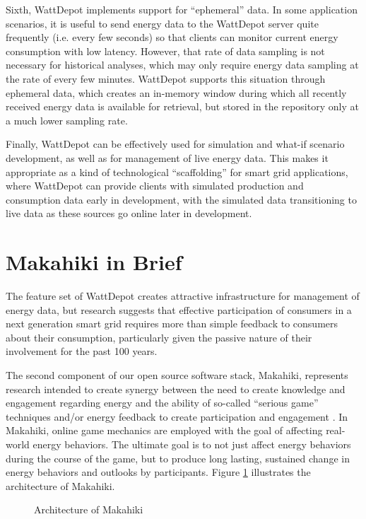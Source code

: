 \documentclass{acm_proc_article-sp}
\begin{document}
Sixth, WattDepot implements support for ``ephemeral'' data. In some application scenarios,
it is useful to send energy data to the WattDepot server quite frequently (i.e. every few
seconds) so that clients can monitor current energy consumption with low latency. However,
that rate of data sampling is not necessary for historical analyses, which may only
require energy data sampling at the rate of every few minutes. WattDepot supports this
situation through ephemeral data, which creates an in-memory window during which all
recently received energy data is available for retrieval, but stored in the repository
only at a much lower sampling rate.

Finally, WattDepot can be effectively used for simulation and what-if scenario
development, as well as for management of live energy data.  This makes it appropriate as
a kind of technological ``scaffolding'' for smart grid applications, where WattDepot can
provide clients with simulated production and consumption data early in development, with
the simulated data transitioning to live data as these sources go online later in development.

\section{Makahiki in Brief}

The feature set of WattDepot creates attractive infrastructure for management of energy
data, but research suggests that effective participation of consumers in a next generation
smart grid requires more than simple feedback to consumers about their consumption,
particularly given the passive nature of their involvement for the past 100 years. 

The second component of our open source software stack, Makahiki, represents research
intended to create synergy between the need to create knowledge and engagement regarding
energy and the ability of so-called ``serious game'' techniques and/or energy feedback to
create participation and engagement \cite{Deterding2011mt,darby-review-2006,Faruqui09,petersen-dorm-energy-reduction}.
In Makahiki, online game mechanics are employed with the goal of affecting
real-world energy behaviors.  The ultimate goal is to not just affect energy behaviors
during the course of the game, but to produce long lasting, sustained change in energy
behaviors and outlooks by participants. Figure \ref{fig:makahiki-architecture} illustrates
the architecture of Makahiki.

\begin{figure}
\begin{center}
\end{center}
\caption{Architecture of Makahiki}
\label{fig:makahiki-architecture}
\end{figure}
\end{document}
